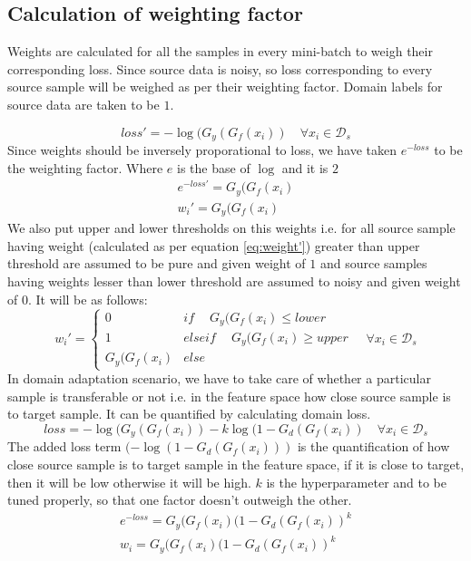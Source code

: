 \subsection{Calculation of weighting factor}
Weights are calculated for all the samples in every mini-batch to weigh their corresponding loss. Since source data is noisy, so loss corresponding to every source sample will be weighed as per their weighting factor. Domain labels for source data are taken to be $1$.

\begin{equation*}
    loss' = -\log(G_y(G_f(x_i)) \quad \forall x_i \in \mathcal{D}_s
\end{equation*}
Since weights should be inversely proporational to loss, we have taken $e^{-loss}$ to be the weighting factor. Where $e$ is the base of $\log$ and it is $2$
\begin{equation}
\label{eq:weight'}
\begin{align}
    e^{-loss'} = G_y(G_f(x_i)\\
    w_{i}' =     G_y(G_f(x_i)
\end{align}
\end{equation}
We also put upper and lower thresholds on this weights i.e. for all source sample having weight (calculated as per equation \ref{eq:weight'}) greater than upper threshold are assumed to be pure and given weight of $1$ and source samples having weights lesser than lower threshold are assumed to noisy and given weight of $0$. It will be as follows:
\begin{equation*}
                w_{i}' = \begin{cases}
		            0 & if\ \quad G_y(G_f(x_i) \le lower \\
		            1 & elseif\ \quad G_y(G_f(x_i) \ge upper \\
		            G_y(G_f(x_i) & else\ 
		            \end{cases} \quad \forall x_i \in \mathcal{D}_s
\end{equation*}
In domain adaptation scenario, we have to take care of whether a particular sample is transferable or not i.e. in the feature space how close source sample is to target sample. It can be quantified by calculating domain loss.
\begin{equation}
    loss = -\log(G_y(G_f(x_i)) - k \log(1 - G_d(G_f(x_i)) \quad \forall x_i \in \mathcal{D}_s
\end{equation}
The added loss term $(-\log(1 - G_d(G_f(x_i)))$ is the quantification of how close source sample is to target sample in the feature space, if it is close to target, then it will be low otherwise it will be high. $k$ is the hyperparameter and to be tuned properly, so that one factor doesn't outweigh the other.
\begin{equation}
\begin{align}
    e^{-loss} = G_y(G_f(x_i)(1 - G_d(G_f(x_i))^k\\
    w_{i} =     G_y(G_f(x_i)(1 - G_d(G_f(x_i))^k
\end{align}
\end{equation}


